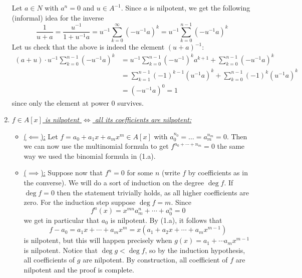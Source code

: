\documentclass[a4paper, 12pt]{article}
\begin{document}
\begin{Exercise}
\begin{enumerate}[label=(\alph*)]
            Let $a \in N$ with $a^n = 0$ and $u \in A^{-1}$.
            Since $a$ is nilpotent, we get the following (informal) idea for the inverse
            \[
                \frac{1}{u + a} = \frac{u^{-1}}{1 + u^{-1}a} = u^{-1} \sum_{k=0}^{\infty}(-u^{-1}a)^k = u^{-1} \sum_{k=0}^{n-1}(-u^{-1}a)^k
            \]
            Let us check that the above is indeed the element $(u + a)^{-1}$:
            \begin{align*}
                ( a + u ) \cdot u^{-1}\sum_{k=0}^{n-1}(-u^{-1}a)^k
                &= u^{-1}\sum_{k=0}^{n-1}(-u^{-1})^ka^{k+1} + \sum_{k=0}^{n-1}(-u^{-1}a)^k \\
                &= \sum_{k=1}^{n-1}(-1)^{k-1}(u^{-1}a)^{k} + \sum_{k=0}^{n-1}(-1)^{k}(u^{-1}a)^k \\
                &= (-u^{-1}a)^0 = 1
            \end{align*}
            since only the element at power $0$ survives.
        \item \underline{\emph{$f \in A[x]$ is nilpotent $\iff$ all its coefficients are nilpotent:}}
            \begin{itemize}
                \item \underline{($\impliedby$):}
                    Let $f = a_0 + a_1x + a_mx^m \in A[x]$ with $a_0^{n_0} = \dots = a_m^{n_m} = 0$.
                    Then we can now use the multinomial formula to get $f^{n_0+\cdots+n_m} = 0$ the same way we used the binomial formula in (1.a).
                \item \underline{($\implies$):}
                    Suppose now that $f^n = 0$ for some $n$ (write $f$ by coefficients as in the converse).
                    We will do a sort of induction on the degree $\deg f$.
                    If $\deg f = 0$ then the statement trivially holds, as all higher coefficients are zero.
                    For the induction step suppose $\deg f = m$.
                    Since
                    \[
                        f^n(x) = x^{mn}a_m^n + \cdots + a_0^{n} = 0
                    \]
                    we get in particular that $a_0$ is nilpotent.
                    By (1.a), it follows that
                    \[
                        f - a_0 = a_1x + \cdots + a_mx^m = x(a_1 + a_2x + \cdots + a_mx^{m-1})
                    \]
                    is nilpotent, but this will happen precisely when $g(x) = a_1 + \cdots a_mx^{m-1}$ is nilpotent.
                    Notice that $\deg g < \deg f$, so by the induction hypothesis, all coefficients of $g$ are nilpotent.
                    By construction, all coefficient of $f$ are nilpotent and the proof is complete.

\end{itemize}
\end{enumerate}
\end{Exercise}
\end{document}
